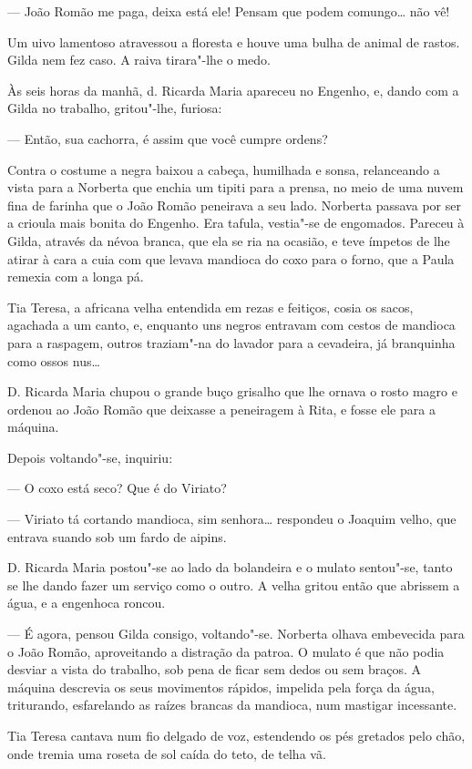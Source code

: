--- João Romão me paga, deixa está ele! Pensam que podem comungo\ldots{} não
vê!

Um uivo lamentoso atravessou a floresta e houve uma bulha de animal de
rastos. Gilda nem fez caso. A raiva tirara"-lhe o medo.

Às seis horas da manhã, d. Ricarda Maria apareceu no Engenho, e, dando
com a Gilda no trabalho, gritou"-lhe, furiosa:

--- Então, sua cachorra, é assim que você cumpre ordens?

Contra o costume a negra baixou a cabeça, humilhada e sonsa, relanceando
a vista para a Norberta que enchia um tipiti para a prensa, no meio de
uma nuvem fina de farinha que o João Romão peneirava a seu lado.
Norberta passava por ser a crioula mais bonita do Engenho. Era tafula,
vestia"-se de engomados. Pareceu à Gilda, através da névoa branca, que
ela se ria na ocasião, e teve ímpetos de lhe atirar à cara a cuia com
que levava mandioca do coxo para o forno, que a Paula remexia com a
longa pá.

Tia Teresa, a africana velha entendida em rezas e feitiços, cosia os
sacos, agachada a um canto, e, enquanto uns negros entravam com cestos
de mandioca para a raspagem, outros traziam"-na do lavador para a
cevadeira, já branquinha como ossos nus\ldots{}

D. Ricarda Maria chupou o grande buço grisalho que lhe ornava o rosto
magro e ordenou ao João Romão que deixasse a peneiragem à Rita, e fosse
ele para a máquina.

Depois voltando"-se, inquiriu:

--- O coxo está seco? Que é do Viriato?

--- Viriato tá cortando mandioca, sim senhora\ldots{} respondeu o Joaquim
velho, que entrava suando sob um fardo de aipins.

D. Ricarda Maria postou"-se ao lado da bolandeira e o mulato sentou"-se,
tanto se lhe dando fazer um serviço como o outro. A velha gritou então
que abrissem a água, e a engenhoca roncou.

--- É agora, pensou Gilda consigo, voltando"-se. Norberta olhava
embevecida para o João Romão, aproveitando a distração da patroa. O
mulato é que não podia desviar a vista do trabalho, sob pena de ficar
sem dedos ou sem braços. A máquina descrevia os seus movimentos rápidos,
impelida pela força da água, triturando, esfarelando as raízes brancas
da mandioca, num mastigar incessante.

Tia Teresa cantava num fio delgado de voz, estendendo os pés gretados
pelo chão, onde tremia uma roseta de sol caída do teto, de telha vã.

